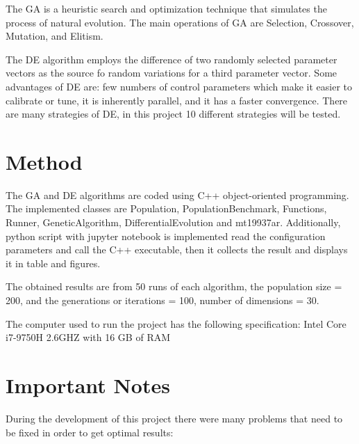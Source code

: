 \documentclass[12pt]{article}
\begin{document}
    The GA is a heuristic search and optimization technique that simulates the process of natural evolution. The main operations of GA are Selection, Crossover, Mutation, and Elitism.
    
    The DE algorithm employs the difference of two randomly selected parameter vectors as the source fo random variations for a third parameter vector. Some advantages of DE are: few numbers of control parameters which make it easier to calibrate or tune, it is inherently parallel, and it has a faster convergence. 
    There are many strategies of DE, in this project 10 different strategies will be tested.
     


    
    \section{Method}
    
    The GA and DE algorithms are coded using C++ object-oriented programming. The implemented classes are Population, PopulationBenchmark,  Functions, Runner, GeneticAlgorithm, DifferentialEvolution and mt19937ar. Additionally,
    python script with jupyter notebook is implemented read the configuration parameters and call the C++ executable, then it collects the result and displays it in table and figures.
    
    The obtained results are from 50 runs of each algorithm, the population size = 200, and the generations or iterations = 100, number of dimensions = 30.

The computer used to run the project has the following specification: Intel Core i7-9750H 2.6GHZ with 16 GB of RAM

  
      
    



\section{Important Notes}

During the development of this project there were many problems that need to be fixed in order to get optimal results:
\end{document}
